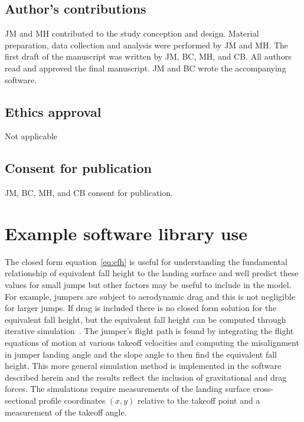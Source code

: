 \documentclass[smallextended]{svjour3}       %
\begin{document}
\subsection*{Author's contributions}
JM and MH contributed to the study conception and design. Material preparation, data collection and analysis were performed by JM and MH. The first draft of the manuscript was written by JM, BC, MH, and CB. All authors read and approved the final manuscript. JM and BC wrote the accompanying software.
\subsection*{Ethics approval}
Not applicable
\subsection*{Consent for publication}
JM, BC, MH, and CB consent for publication.



\appendix

\section{Example software library use}
\label{sec:example}
%
The closed form equation~\ref{eq:efh} is useful for understanding the
fundamental relationship of equivalent fall height to the landing surface and
well predict these values for small jumps but other factors may be useful to
include in the model. For example, jumpers are subject to aerodynamic drag and
this is not negligible for larger jumps. If drag is included there is no closed
form solution for the equivalent fall height, but the equivalent fall height
can be computed through iterative simulation~\cite{Levy2015}. The jumper's
flight path is found by integrating the flight equations of motion at various
takeoff velocities and computing the misalignment in jumper landing angle and
the slope angle to then find the equivalent fall height. This more general
simulation method is implemented in the software described herein and the
results reflect the inclusion of gravitational and drag forces. The simulations
require measurements of the landing surface cross-sectional profile coordinates
$(x,y)$ relative to the takeoff point and a measurement of the takeoff angle.
\end{document}
